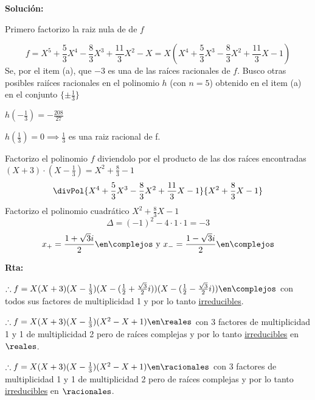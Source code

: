\begin{enumerate}[label=\alph*)]
        \textbf{Solución:}\par

        Primero factorizo la raiz nula de de $f$ \par
        $$
          f=X^5 + \frac{5}{3}X^4 - \frac{8}{3}X^3 + \frac{11}{3}X^2 - X =
          X(X^4 + \frac{5}{3}X^3 - \frac{8}{3}X^2 + \frac{11}{3}X - 1)
        $$
        Se, por el item (a), que $-3$ es una de las raíces racionales de $f$.
        Busco otras posibles raiíces racionales en el polinomio $h$ (con $n=5$)
        obtenido en el item (a) en el conjunto $\{ \pm\frac{1}{3} \}$ \par
        $h(-\frac{1}{3})=-\frac{208}{27}$ \par
        $h(\frac{1}{3})=0 \implies \frac{1}{3}$ es una raiz racional de f. \par

        Factorizo el polinomio $f$ diviendolo por el producto de las dos raíces
        encontradas $(X+3)\cdot(X-\frac{1}{3}) = X^2 + \frac{8}{3} - 1$
        $$
          \divPol{X^4 + \frac{5}{3}X^3 - \frac{8}{3}X^2 + \frac{11}{3}X - 1}{X^2 + \frac{8}{3}X - 1}
        $$
        Factorizo el polinomio cuadrático $X^2 + \frac{8}{3}X - 1$
        $$ \Delta = (-1)^2 - 4 \cdot 1 \cdot 1=-3 $$
        $$ x_+ = \frac{1 + \sqrt 3 i}{2} \en\complejos \text{ y } x_- = \frac{1 - \sqrt 3 i}{2} \en\complejos $$

        \textbf{Rta:}\par
        $\therefore f = X(X+3)( X - \frac{1}{3} )( X - (\frac{1}{2} + \frac{\sqrt 3}{2}i) )( X - (\frac{1}{2} - \frac{\sqrt 3}{2}i) ) \en \complejos$
        con todos sus factores de multiplicidad 1 y por lo tanto \hyperlink{7-teoria:irreducibles}{irreducibles}. \par
        $\therefore f = X(X+3)( X - \frac{1}{3} )(X^2-X+1) \en \reales$
        con 3 factores de multiplicidad 1 y 1 de multiplicidad 2 pero de raíces complejas
        y por lo tanto \hyperlink{7-teoria:irreducibles}{irreducibles} en $\reales$. \par
        $\therefore f = X(X+3)( X - \frac{1}{3} )(X^2-X+1) \en \racionales$
        con 3 factores de multiplicidad 1 y 1 de multiplicidad 2 pero de raíces complejas
        y por lo tanto \hyperlink{7-teoria:irreducibles}{irreducibles} en $\racionales$.
\end{enumerate}












